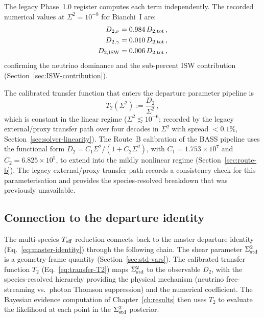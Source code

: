 The legacy Phase~1.0 register computes each term independently.
The recorded numerical values at
$\Sigma^2 = 10^{-8}$ for Bianchi~I are:
\begin{equation}\label{eq:D2-production}
\begin{aligned}
D_{2,\nu} &= 0.984\, D_{2,\rm tot}\,, \\
D_{2,\gamma} &= 0.010\, D_{2,\rm tot}\,, \\
D_{2,\rm ISW} &= 0.006\, D_{2,\rm tot}\,,
\end{aligned}
\end{equation}
confirming the neutrino dominance and the sub-percent
ISW contribution (Section~\ref{sec:ISW-contribution}).

The calibrated transfer function that enters the
departure parameter pipeline is
\begin{equation}\label{eq:transfer-T2}
T_2(\Sigma^2) := \frac{D_2}{\Sigma^2}\,,
\end{equation}
which is constant in the linear regime
($\Sigma^2 \lesssim 10^{-6}$; recorded by the
legacy external/proxy transfer path over four decades in $\Sigma^2$ with spread
$< 0.1\%$, Section~\ref{sec:solver-linearity}).
The Route~B calibration of the BASS pipeline uses the
functional form
$D_2 = C_1 \Sigma^2/(1 + C_2 \Sigma^2)$, with
$C_1 = 1.753 \times 10^7$ and
$C_2 = 6.825 \times 10^5$, to extend into the mildly
nonlinear regime (Section~\ref{sec:route-b}).  The
legacy external/proxy transfer path records a consistency check
for this parameterisation and provides the species-resolved
breakdown that was previously unavailable.


\subsection{Connection to the departure identity}
\label{sec:connection-departure}

The multi-species $T_{\mathrm{eff}}$ reduction connects back to
the master departure identity
(Eq.~\ref{eq:master-identity}) through the following
chain.  The shear parameter $\Sigma^2_{\mathrm{std}}$ is a
geometry-frame quantity (Section~\ref{sec:std-vars}).
The calibrated transfer function $T_2$
(Eq.~\ref{eq:transfer-T2}) maps $\Sigma^2_{\mathrm{std}}$ to the
observable $D_2$, with the species-resolved hierarchy
providing the physical mechanism (neutrino
free-streaming vs.\ photon Thomson suppression) and
the numerical coefficient.  The Bayesian evidence
computation of Chapter~\ref{ch:results} then
uses $T_2$ to evaluate the likelihood at each point
in the $\Sigma^2_{\mathrm{std}}$ posterior.

